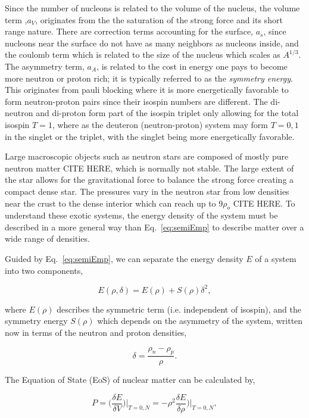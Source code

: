 Since the number of nucleons is related to the volume of the nucleus, the volume term ,$a_V$, originates from the the saturation of the strong force and its short range nature. There are correction terms accounting for the surface, $a_s$, since nucleons near the surface do not have as many neighbors as nucleons inside, and the coulomb term which is related to the size of the nucleus which scales as $A^{1/3}$. The asymmetry term, $a_A$, is related to the cost in energy one pays to become more neutron or proton rich; it is typically referred to as the \emph{symmetry energy}. This originates from pauli blocking where it is more energetically favorable to form neutron-proton pairs since their isospin numbers are different. The di-neutron and di-proton form part of the isospin triplet only allowing for the total isospin $T=1$, where as the deuteron (neutron-proton) system may form $T={0,1}$ in the singlet or the triplet, with the singlet being more energetically favorable. 

Large macroscopic objects such as neutron stars are composed of mostly pure neutron matter CITE HERE, which is normally not stable. The large extent of the star allows for the gravitational force to balance the strong force creating a compact dense star. The pressures vary in the neutron star from low densities near the crust to the dense interior which can reach up to 9$\rho_o$ CITE HERE. To understand these exotic systems, the energy density of the system must be described in a more general way than Eq.~\ref{eq:semiEmp} to describe matter over a wide range of densities. 

Guided by Eq.~\ref{eq:semiEmp}, we can separate the energy density $E$ of a system into two components,

\begin{equation}
E(\rho,\delta) = E(\rho	) + S(\rho)\delta^2,
\label{eq:energyEos}
\end{equation}

where $E(\rho)$ describes the symmetric term (i.e. independent of isospin), and the symmetry energy $S(\rho)$ which depends on the asymmetry of the system, written now in terms of the neutron and proton densities, 

\begin{equation}
\delta = \frac{\rho_n - \rho_p}{\rho}.
\label{eq:asym}
\end{equation}

The Equation of State (EoS) of nuclear matter can be calculated by, 

\begin{equation}
P = \Big(\frac{\delta E}{\delta V}\Big)\vert_{T=0,N} = -\rho^2 \frac{\delta E}{\delta \rho}\Big)\vert_{T=0,N}, 
\label{eq:pressEos}
\end{equation}

